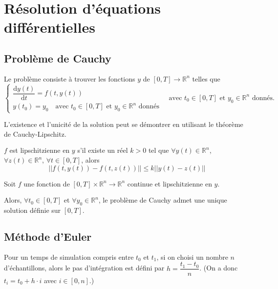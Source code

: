 \section{Résolution d'équations différentielles}


\subsection{Problème de Cauchy}

Le problème consiste à trouver les fonctions $y$ de $[0,T]\rightarrow \mathbb{R}^n$ telles que
$$
\left\{
\begin{array}{l}
\dfrac{\text{d} y(t)}{\text{d} t}=f(t,y(t)) \\
y(t_0)=y_0 \quad \text{avec } t_0\in [0,T] \text{ et } y_0\in \mathbb{R}^n \text{ donnés}
\end{array}
\quad \text{avec } t_0\in [0,T] \text{ et } y_0\in \mathbb{R}^n \text{ donnés.}
\right.
 $$ 

L'existence et l'unicité de la solution peut se démontrer en utilisant le théorème de Cauchy-Lipschitz.


\begin{defi}

$f$ est lipschitzienne en $y$ s'il existe un réel $k>0$ tel que $\forall y(t)\in\mathbb{R}^n$, $\forall z(t)\in\mathbb{R}^n$, $\forall t\in[0,T]$, alors 
$$
||f(t,y(t))-f(t,z(t))||\leq k||y(t)-z(t)||
$$

\end{defi}

\begin{theoreme}

Soit $f$ une fonction de $[0,T] \times \mathbb{R}^n \rightarrow \mathbb{R}^n$ continue et lipschitzienne en $y$. 

Alors, $\forall t_0 \in [0,T]$ et $\forall y_0 \in \mathbb{R}^n$, le problème de Cauchy admet une unique solution définie sur $[0,T]$.

\end{theoreme}

\subsection{Méthode d'Euler}
Pour un temps de simulation compris entre $t_0$ et $t_1$, si on choisi un nombre $n$ d'échantillons, alors le pas d'intégration est défini par  $h=\dfrac{t_1-t_0}{n}$. (On a donc $t_i = t_0+h\cdot i$ avec $i\in[0,n]$.)

